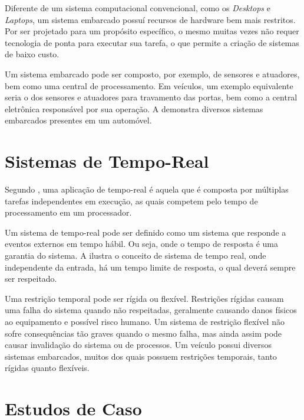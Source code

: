 Diferente de um sistema computacional convencional, como os \emph{Desktops} e \emph{Laptops}, um sistema embarcado possuí recursos de hardware bem mais restritos. Por ser projetado para um propósito específico, o mesmo muitas vezes não requer tecnologia de ponta para executar sua tarefa, o que permite a criação de sistemas de baixo custo.

Um sistema embarcado pode ser composto, por exemplo, de sensores e atuadores, bem como uma central de processamento. Em veículos, um exemplo equivalente seria o dos sensores e atuadores para travamento das portas, bem como a central eletrônica responsável por sua operação. A  demonstra diversos sistemas embarcados presentes em um automóvel.


\section{Sistemas de Tempo-Real}

Segundo , uma aplicação de tempo-real é aquela que é composta por múltiplas tarefas independentes em execução, as quais competem pelo tempo de processamento em um processador.

Um sistema de tempo-real pode ser definido como um sistema que responde a eventos externos em tempo hábil. Ou seja, onde o tempo de resposta é uma garantia do sistema. A  ilustra o conceito de sistema de tempo real, onde independente da entrada, há um tempo limite de resposta, o qual deverá sempre ser respeitado.


Uma restrição temporal pode ser rígida ou flexível. Restrições rígidas causam uma falha do sistema quando não respeitadas, geralmente causando danos físicos ao equipamento e possível risco humano. Um sistema de restrição flexível não sofre consequências tão graves quando o mesmo falha, mas ainda assim pode causar invalidação do sistema ou de processos. Um veículo possui diversos sistemas embarcados, muitos dos quais possuem restrições temporais, tanto rígidas quanto flexíveis.

\section{Estudos de Caso}


